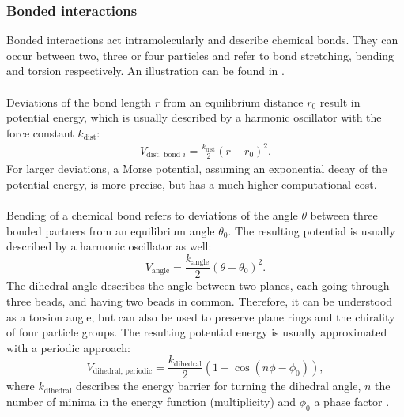 \subsubsection{Bonded interactions}
Bonded interactions act intramolecularly and describe chemical bonds. They can occur between two, three or four particles and refer to bond stretching, bending and torsion respectively. An illustration can be found in .\\
\\
Deviations of the bond length $r$ from an equilibrium distance $r_0$ result in potential energy, which is usually described by a harmonic oscillator with the force constant $k_\text{dist}$:
\begin{align}
V_{\text{dist, bond }i} = \frac{k_{\text{dist}}}{2}\left( r - r_{0} \right)^{2}.
\end{align}
For larger deviations, a Morse potential, assuming an exponential decay of the potential energy, is more precise, but has a much higher computational cost.\\
\\
Bending of a chemical bond refers to deviations of the angle $\theta$ between three bonded partners from an equilibrium angle $\theta_0$. The resulting potential is usually described by a harmonic oscillator as well:
\begin{equation}
V_\text{angle} = \frac{k_\text{angle}}{2}\left( \theta - \theta_0 \right)^{2}.
\end{equation}
The dihedral angle describes the angle between two planes, each going through three beads, and having two beads in common. Therefore, it can be understood as a torsion angle, but can also be used to preserve plane rings and the chirality of four particle groups. The resulting potential energy is usually approximated with a periodic approach:
\begin{equation}
V_{\text{dihedral, periodic}} = \frac{k_\text{dihedral}}{2}\left(1 + \cos\left(n \phi - \phi_0 \right)\right),
\end{equation}
where $k_\text{dihedral}$ describes the energy barrier for turning the dihedral angle, $n$ the number of minima in the energy function (multiplicity) and $\phi_0$ a phase factor \autocite[p. 71-83]{gromacsManual}.
%
%
%
